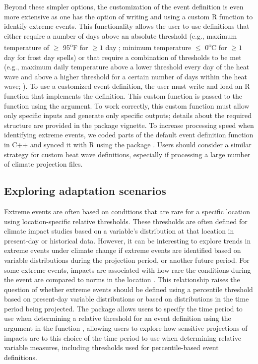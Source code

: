 Beyond these simpler options, the customization of the event definition
is even more extensive as one has the option of writing and using a
custom R function to identify extreme events. This functionality allows
the user to use definitions that either require a number of days above
an absolute threshold (e.g., maximum temperature of \(\ge\)
95\textsuperscript{o}F for \(\ge1\) day
\citet{kent2014heat, tan2007heat}; minimum temperature \(\le\)
0\textsuperscript{o}C for \(\ge1\) day for frost day spells) or that
require a combination of thresholds to be met (e.g., maximum daily
temperature above a lower threshold every day of the heat wave and above
a higher threshold for a certain number of days within the heat wave;
\citet{kent2014heat, peng2011toward}). To use a customized event
definition, the user must write and load an R function that implements
the definition. This custom function is passed to the
 function using the 
argument. To work correctly, this custom function must allow only
specific inputs and generate only specific outputs; details about the
required structure are provided in the  package
vignette. To increase processing speed when identifying extreme events,
we coded parts of the default event definition function in C++ and
synced it with R using the  package \citep{Rcpp}. Users
should consider a similar strategy for custom heat wave definitions,
especially if processing a large number of climate projection files.

\subsection{Exploring adaptation
scenarios}\label{exploring-adaptation-scenarios}

Extreme events are often based on conditions that are rare for a
specific location using location-specific relative thresholds. These
thresholds are often defined for climate impact studies based on a
variable's distribution at that location in present-day or historical
data. However, it can be interesting to explore trends in extreme events
under climate change if extreme events are identified based on variable
distributions during the projection period, or another future period.
For some extreme events, impacts are associated with how rare the
conditions during the event are compared to norms in the location
\citep{anderson2009weather}. This relationship raises the question of
whether extreme events should be defined using a percentile threshold
based on present-day variable distributions or based on distributions in
the time period being projected. The  package
allows users to specify the time period to use when determining a
relative threshold for an event definition using the
 argument in the function ,
allowing users to explore how sensitive projections of impacts are to
this choice of the time period to use when determining relative variable
measures, including thresholds used for percentile-based event
definitions.

